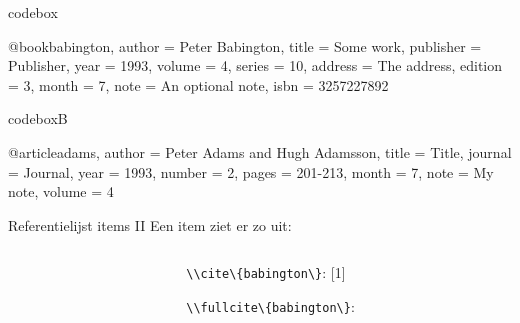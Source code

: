 

\begin{saveblock}{codebox}
	\begin{highlightblock}[linewidth=0.55\textwidth]
		@book{babington,
			author = {Peter Babington},
			title = {Some work},
			publisher = {Publisher},
			year = 1993,
			volume = 4,
			series = 10,
			address = {The address},
			edition = 3,
			month = 7,
			note = {An optional note},
			isbn = {3257227892}
		}
	\end{highlightblock}
\end{saveblock}

\begin{saveblock}{codeboxB}
	\begin{highlightblock}[linewidth=0.55\textwidth]
		@article{adams,
			author  = {Peter Adams
				and Hugh Adamsson},
			title   = {Title},
			journal = {Journal},
			year    = 1993,
			number  = 2,
			pages   = {201-213},
			month   = 7,
			note    = {My note}, 
			volume  = 4
		}
	\end{highlightblock}
\end{saveblock}

\begin{frame}{Referentielijst items II}
	Een item ziet er zo uit:
	
	\begin{columns}
		\begin{column}{0.55\textwidth}
		\end{column}
		\begin{column}{0.35\textwidth}%
			\lstinline|\\cite\{babington\}|: [1]
			
			\lstinline|\\fullcite\{babington\}|:\\
		\end{column}
	\end{columns}
\end{frame}
